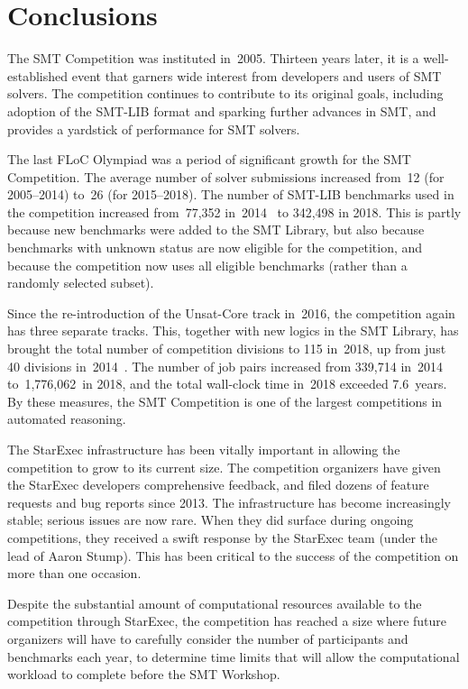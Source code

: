 \documentclass[dvipsnames,table,twoside,11pt]{article}
\begin{document}

\section{Conclusions}
\label{sec:conclusions}

The SMT Competition was instituted in~2005.  Thirteen years later, it
is a well-established event that garners wide interest from developers
and users of SMT solvers.  The competition continues to contribute to
its original goals, including adoption of the SMT-LIB format and
sparking further advances in SMT, and provides a yardstick of
performance for SMT solvers.

The last FLoC Olympiad was a period of significant growth for the SMT
Competition.  The average number of solver submissions increased
from~12 (for 2005--2014) to~26 (for 2015--2018).  The number of
SMT-LIB benchmarks used in the competition increased from~77,352
in~2014~\cite{CDW14} to 342,498 in 2018.  This is partly because new
benchmarks were added to the SMT Library, but also because benchmarks
with unknown status are now eligible for the competition, and because
the competition now uses all eligible benchmarks (rather than a
randomly selected subset).

Since the re-introduction of the Unsat-Core track in~2016, the
competition again has three separate tracks.  This, together with new
logics in the SMT Library, has brought the total number of competition
divisions to 115 in~2018, up from just 40 divisions
in~2014~\cite{CDW14}.  The number of job pairs increased from 339,714
in~2014 to~1,776,062~in 2018, and the total wall-clock time in~2018
exceeded 7.6~years.  By these measures, the SMT Competition is one of
the largest competitions in automated reasoning.

The StarExec infrastructure has been vitally important in allowing the
competition to grow to its current size.  The competition organizers
have given the StarExec developers comprehensive feedback, and filed
dozens of feature requests and bug reports since 2013.  The
infrastructure has become increasingly stable; serious issues are now
rare.  When they did surface during ongoing competitions, they
received a swift response by the StarExec team (under the lead of
Aaron Stump).  This has been critical to the success of the
competition on more than one occasion.

Despite the substantial amount of computational resources available to
the competition through StarExec, the competition has reached a size
where future organizers will have to carefully consider the number of
participants and benchmarks each year, to determine time limits that
will allow the computational workload to complete before the SMT
Workshop.
\end{document}
